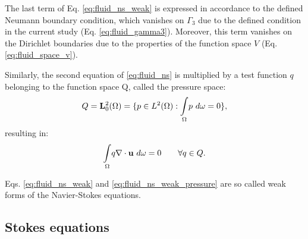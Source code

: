 \noindent The last term of Eq. \ref{eq:fluid_ns_weak} is expressed in accordance to the defined Neumann boundary condition, which vanishes on $\Gamma_3$ due to the defined condition in the current study (Eq. \ref{eq:fluid_gamma3}). Moreover, this term vanishes on the Dirichlet boundaries due to the properties of the function space $V$ (Eq. \ref{eq:fluid_space_v}).

Similarly, the second equation of \ref{eq:fluid_ns} is multiplied by a test function $q$ belonging to the function space Q, called the pressure space: 
\begin{equation}
Q = {\bf L}^2_0(\Omega) = \lbrace p \in L^2(\Omega) : {\mathop{\int}_{\Omega}} p \ d\omega = 0\rbrace,
\end{equation}
resulting in:
\begin{equation} \label{eq:fluid_ns_weak_pressure}
{\mathop{\int}_{\Omega}} q \nabla\cdot{\bf u}\ d\omega = 0 \qquad \forall q \in Q.
\end{equation}

Eqs. \ref{eq:fluid_ns_weak} and \ref{eq:fluid_ns_weak_pressure} are so called weak forms of the Navier-Stokes equations. 

\subsection{Stokes equations}

